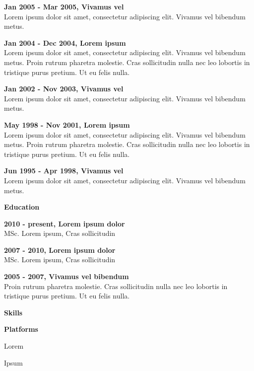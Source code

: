\documentclass[a4paper,10pt,final]{memoir}
\newcommand{\Sep}{\vspace{1.5em}}
\newcommand{\SmallSep}{\vspace{0.5em}}
\newcommand{\CVSection}[1]
  {\Large\textbf{#1}\par
  \SmallSep\normalsize\normalfont}
\newcommand{\CVItem}[1]
  {\textbf{\color{RoyalBlue} #1}}
\begin{document}
\CVItem{Jan 2005 - Mar 2005, Vivamus vel}\\
Lorem ipsum dolor sit amet, consectetur adipiscing elit. Vivamus vel bibendum metus.
\SmallSep

\CVItem{Jan 2004 - Dec 2004, Lorem ipsum}\\
Lorem ipsum dolor sit amet, consectetur adipiscing elit. Vivamus vel bibendum metus. Proin rutrum pharetra molestie. Cras sollicitudin nulla nec leo lobortis in tristique purus pretium. Ut eu felis nulla.
\SmallSep

\CVItem{Jan 2002 - Nov 2003, Vivamus vel}\\
Lorem ipsum dolor sit amet, consectetur adipiscing elit. Vivamus vel bibendum metus.
\SmallSep

\CVItem{May 1998 - Nov 2001, Lorem ipsum}\\
Lorem ipsum dolor sit amet, consectetur adipiscing elit. Vivamus vel bibendum metus. Proin rutrum pharetra molestie. Cras sollicitudin nulla nec leo lobortis in tristique purus pretium. Ut eu felis nulla.
\SmallSep

\CVItem{Jun 1995 - Apr 1998, Vivamus vel}\\
Lorem ipsum dolor sit amet, consectetur adipiscing elit. Vivamus vel bibendum metus.

\Sep

\CVSection{Education}
\CVItem{2010 - present, Lorem ipsum dolor}\\
MSc. Lorem ipsum, Cras sollicitudin
\SmallSep

\CVItem{2007 - 2010, Lorem ipsum dolor}\\
MSc. Lorem ipsum, Cras sollicitudin
\SmallSep

\clearpage
\framebreak
\framebreak

\CVItem{2005 - 2007, Vivamus vel bibendum}\\
Proin rutrum pharetra molestie. Cras sollicitudin nulla nec leo lobortis in tristique purus pretium. Ut eu felis nulla.
\Sep


\CVSection{Skills}
\CVItem{Platforms}
\begin{multicols}{3}
\begin{compactitem}[\color{RoyalBlue}$\circ$]
  \item Lorem 
  \item Ipsum 
\end{compactitem}
\end{multicols}
\SmallSep
\end{document}

